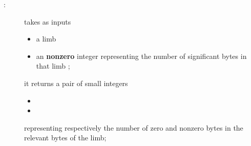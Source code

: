 \begin{description}
    \item[\rlpUtilsInstDataPricing{}:]
        takes as inputs
        \begin{itemize}
            \item a limb 
            \item an \textbf{nonzero} integer  representing the number of significant bytes in that limb ;
        \end{itemize}
        it returns a pair of small integers
        \begin{itemize}
            \item {}
            \item {}
        \end{itemize}
        representing respectively the number of zero and nonzero bytes in the relevant bytes of the limb;
\end{description}
